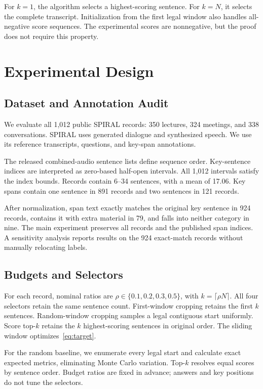 \documentclass[10pt,journal,compsoc]{IEEEtran}
\begin{document}
For $k=1$, the algorithm selects a highest-scoring sentence. For $k=N$, it selects the complete transcript. Initialization from the first legal window also handles all-negative score sequences. The experimental scores are nonnegative, but the proof does not require this property.

\section{Experimental Design}
\subsection{Dataset and Annotation Audit}
We evaluate all 1,012 public SPIRAL records\cite{lin2025speechprune}: 350 lectures, 324 meetings, and 338 conversations. SPIRAL uses generated dialogue and synthesized speech. We use its reference transcripts, questions, and key-span annotations.

The released combined-audio sentence lists define sequence order. Key-sentence indices are interpreted as zero-based half-open intervals. All 1,012 intervals satisfy the index bounds. Records contain 6--34 sentences, with a mean of 17.06. Key spans contain one sentence in 891 records and two sentences in 121 records.

After normalization, span text exactly matches the original key sentence in 924 records, contains it with extra material in 79, and falls into neither category in nine. The main experiment preserves all records and the published span indices. A sensitivity analysis reports results on the 924 exact-match records without manually relocating labels.

\subsection{Budgets and Selectors}
For each record, nominal ratios are $\rho\in\{0.1,0.2,0.3,0.5\}$, with $k=\lceil\rho N\rceil$. All four selectors retain the same sentence count. First-window cropping retains the first $k$ sentences. Random-window cropping samples a legal contiguous start uniformly. Score top-$k$ retains the $k$ highest-scoring sentences in original order. The sliding window optimizes~\eqref{eq:target}.

For the random baseline, we enumerate every legal start and calculate exact expected metrics, eliminating Monte Carlo variation. Top-$k$ resolves equal scores by sentence order. Budget ratios are fixed in advance; answers and key positions do not tune the selectors.
\end{document}
